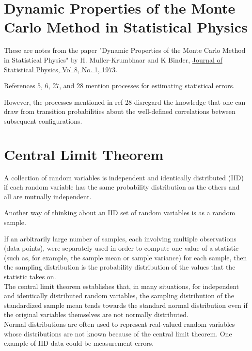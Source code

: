 \section{Dynamic Properties of the Monte Carlo Method in Statistical Physics}

These are notes from the paper
"Dynamic Properties of the Monte Carlo Method in Statistical Physics"
by H. Muller-Krumbhaar and K Binder,
\href{https://link.springer.com/article/10.1007/BF01008440}{Journal of Statistical Physics, Vol 8, No. 1, 1973}.

References 5, 6, 27, and 28 mention processes for estimating statistical errors.

However, the processes mentioned in ref 28 disregard the knowledge that one can draw from
transition probabilities about the well-defined correlations between subsequent configurations.




\section{Central Limit Theorem}

A collection of random variables is independent and identically distributed (IID)
if each random variable has the same probability distribution as the others and
all are mutually independent.

Another way of thinking about an IID set of random variables is as a random sample.

If an arbitrarily large number of samples, each involving multiple observations (data points),
were separately used in order to compute one value of a statistic
(such as, for example, the sample mean or sample variance) for each sample,
then the sampling distribution is the probability distribution of the values that the statistic takes on.
\\

The central limit theorem establishes that, in many situations,
for independent and identically distributed random variables,
the sampling distribution of the standardized sample mean tends towards the standard normal distribution
even if the original variables themselves are not normally distributed.
\\

Normal distributions are often used to represent real-valued random variables
whose distributions are not known because of the central limit theorem.
One example of IID data could be measurement errors.